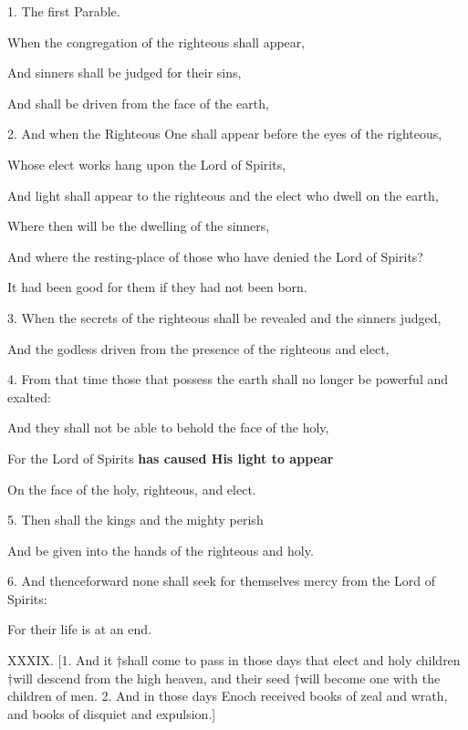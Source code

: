 

1. The first Parable.

When the congregation of the righteous shall appear,

And sinners shall be judged for their sins,

And shall be driven from the face of the earth,

2. And when the Righteous One shall appear before the eyes of the righteous,

Whose elect works hang upon the Lord of Spirits,

And light shall appear to the righteous and the elect who dwell on the earth,

Where then will be the dwelling of the sinners,

And where the resting-place of those who have denied the Lord of Spirits?

It had been good for them if they had not been born.

3. When the secrets of the righteous shall be revealed and the sinners judged,

And the godless driven from the presence of the righteous and elect,

4. From that time those that possess the earth shall no longer be powerful and exalted:

And they shall not be able to behold the face of the holy,

For the Lord of Spirits \textbf{has caused His light to appear}

On the face of the holy, righteous, and elect.

5. Then shall the kings and the mighty perish

And be given into the hands of the righteous and holy.

6. And thenceforward none shall seek for themselves mercy from the Lord of Spirits:

For their life is at an end.


XXXIX. [1. And it †shall come to pass in those
days that elect and holy children †will descend
from the high heaven, and their seed †will become
one with the children of men. 2. And in those
days Enoch received books of zeal and wrath, and
books of disquiet and expulsion.]

